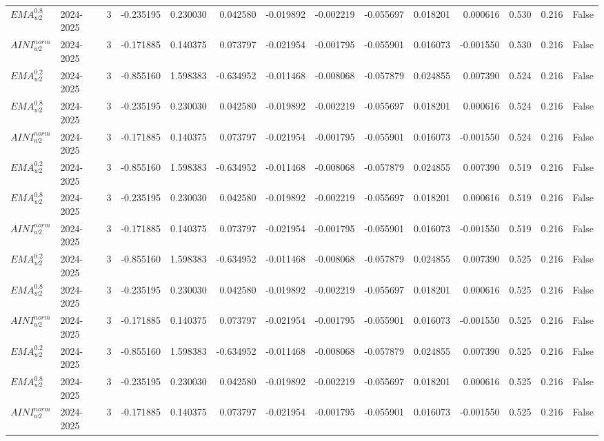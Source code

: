 \begin{tabular}{@{}llrrrrrrrrrlll@{}}
$EMA^{0.8}_{w2}$ & 2024-2025 & 3 & -0.235195 & 0.230030 & 0.042580 & -0.019892 & -0.002219 & -0.055697 & 0.018201 & 0.000616 & 0.530 & 0.216 & False \\
$AINI^{norm}_{w2}$ & 2024-2025 & 3 & -0.171885 & 0.140375 & 0.073797 & -0.021954 & -0.001795 & -0.055901 & 0.016073 & -0.001550 & 0.530 & 0.216 & False \\
$EMA^{0.2}_{w2}$ & 2024-2025 & 3 & -0.855160 & 1.598383 & -0.634952 & -0.011468 & -0.008068 & -0.057879 & 0.024855 & 0.007390 & 0.524 & 0.216 & False \\
$EMA^{0.8}_{w2}$ & 2024-2025 & 3 & -0.235195 & 0.230030 & 0.042580 & -0.019892 & -0.002219 & -0.055697 & 0.018201 & 0.000616 & 0.524 & 0.216 & False \\
$AINI^{norm}_{w2}$ & 2024-2025 & 3 & -0.171885 & 0.140375 & 0.073797 & -0.021954 & -0.001795 & -0.055901 & 0.016073 & -0.001550 & 0.524 & 0.216 & False \\
$EMA^{0.2}_{w2}$ & 2024-2025 & 3 & -0.855160 & 1.598383 & -0.634952 & -0.011468 & -0.008068 & -0.057879 & 0.024855 & 0.007390 & 0.519 & 0.216 & False \\
$EMA^{0.8}_{w2}$ & 2024-2025 & 3 & -0.235195 & 0.230030 & 0.042580 & -0.019892 & -0.002219 & -0.055697 & 0.018201 & 0.000616 & 0.519 & 0.216 & False \\
$AINI^{norm}_{w2}$ & 2024-2025 & 3 & -0.171885 & 0.140375 & 0.073797 & -0.021954 & -0.001795 & -0.055901 & 0.016073 & -0.001550 & 0.519 & 0.216 & False \\
$EMA^{0.2}_{w2}$ & 2024-2025 & 3 & -0.855160 & 1.598383 & -0.634952 & -0.011468 & -0.008068 & -0.057879 & 0.024855 & 0.007390 & 0.525 & 0.216 & False \\
$EMA^{0.8}_{w2}$ & 2024-2025 & 3 & -0.235195 & 0.230030 & 0.042580 & -0.019892 & -0.002219 & -0.055697 & 0.018201 & 0.000616 & 0.525 & 0.216 & False \\
$AINI^{norm}_{w2}$ & 2024-2025 & 3 & -0.171885 & 0.140375 & 0.073797 & -0.021954 & -0.001795 & -0.055901 & 0.016073 & -0.001550 & 0.525 & 0.216 & False \\
$EMA^{0.2}_{w2}$ & 2024-2025 & 3 & -0.855160 & 1.598383 & -0.634952 & -0.011468 & -0.008068 & -0.057879 & 0.024855 & 0.007390 & 0.525 & 0.216 & False \\
$EMA^{0.8}_{w2}$ & 2024-2025 & 3 & -0.235195 & 0.230030 & 0.042580 & -0.019892 & -0.002219 & -0.055697 & 0.018201 & 0.000616 & 0.525 & 0.216 & False \\
$AINI^{norm}_{w2}$ & 2024-2025 & 3 & -0.171885 & 0.140375 & 0.073797 & -0.021954 & -0.001795 & -0.055901 & 0.016073 & -0.001550 & 0.525 & 0.216 & False \\

\end{tabular}
